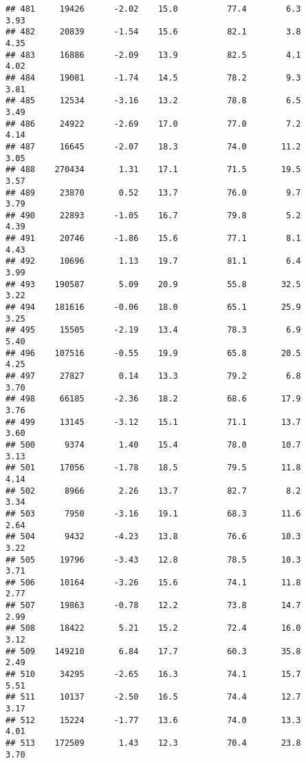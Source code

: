 \documentclass[
]{article}
\begin{document}
\begin{verbatim}
## 481     19426      -2.02    15.0          77.4        6.3              3.93
## 482     20839      -1.54    15.6          82.1        3.8              4.35
## 483     16886      -2.09    13.9          82.5        4.1              4.02
## 484     19081      -1.74    14.5          78.2        9.3              3.81
## 485     12534      -3.16    13.2          78.8        6.5              3.49
## 486     24922      -2.69    17.0          77.0        7.2              4.14
## 487     16645      -2.07    18.3          74.0       11.2              3.05
## 488    270434       1.31    17.1          71.5       19.5              3.57
## 489     23870       0.52    13.7          76.0        9.7              3.79
## 490     22893      -1.05    16.7          79.8        5.2              4.39
## 491     20746      -1.86    15.6          77.1        8.1              4.43
## 492     10696       1.13    19.7          81.1        6.4              3.99
## 493    190587       5.09    20.9          55.8       32.5              3.22
## 494    181616      -0.06    18.0          65.1       25.9              3.25
## 495     15505      -2.19    13.4          78.3        6.9              5.40
## 496    107516      -0.55    19.9          65.8       20.5              4.25
## 497     27827       0.14    13.3          79.2        6.8              3.70
## 498     66185      -2.36    18.2          68.6       17.9              3.76
## 499     13145      -3.12    15.1          71.1       13.7              3.60
## 500      9374       1.40    15.4          78.0       10.7              3.13
## 501     17056      -1.78    18.5          79.5       11.8              4.14
## 502      8966       2.26    13.7          82.7        8.2              3.34
## 503      7950      -3.16    19.1          68.3       11.6              2.64
## 504      9432      -4.23    13.8          76.6       10.3              3.22
## 505     19796      -3.43    12.8          78.5       10.3              3.71
## 506     10164      -3.26    15.6          74.1       11.8              2.77
## 507     19863      -0.78    12.2          73.8       14.7              2.99
## 508     18422       5.21    15.2          72.4       16.0              3.12
## 509    149210       6.84    17.7          60.3       35.8              2.49
## 510     34295      -2.65    16.3          74.1       15.7              5.51
## 511     10137      -2.50    16.5          74.4       12.7              3.17
## 512     15224      -1.77    13.6          74.0       13.3              4.01
## 513    172509       1.43    12.3          70.4       23.8              3.70

\end{verbatim}
\end{document}
